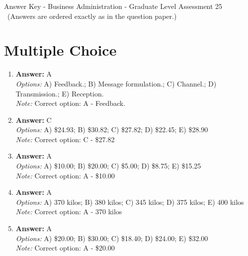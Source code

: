 \documentclass[12pt]{article}
\begin{document}
\begin{center}
Answer Key - Business Administration - Graduate Level Assessment 25 \
\small (Answers are ordered exactly as in the question paper.)
\end{center}

\section*{Multiple Choice}
\begin{enumerate}[label=\arabic*.]
\item \textbf{Answer:} A
\\ \textit{Options:} A) Feedback.; B) Message formulation.; C) Channel.; D) Transmission.; E) Reception.
\\ \textit{Note:} Correct option: A - Feedback.
\item \textbf{Answer:} C
\\ \textit{Options:} A) \$24.93; B) \$30.82; C) \$27.82; D) \$22.45; E) \$28.90
\\ \textit{Note:} Correct option: C - \$27.82
\item \textbf{Answer:} A
\\ \textit{Options:} A) \$10.00; B) \$20.00; C) \$5.00; D) \$8.75; E) \$15.25
\\ \textit{Note:} Correct option: A - \$10.00
\item \textbf{Answer:} A
\\ \textit{Options:} A) 370 kilos; B) 380 kilos; C) 345 kilos; D) 375 kilos; E) 400 kilos
\\ \textit{Note:} Correct option: A - 370 kilos
\item \textbf{Answer:} A
\\ \textit{Options:} A) \$20.00; B) \$30.00; C) \$18.40; D) \$24.00; E) \$32.00
\\ \textit{Note:} Correct option: A - \$20.00
\end{enumerate}
\end{document}
